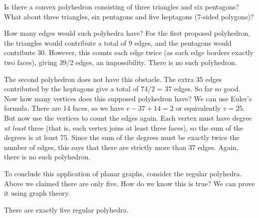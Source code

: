 \documentclass[12pt]{article}
\begin{document}
\begin{example}
Is there a convex polyhedron consisting of three triangles and six pentagons?  What about three triangles, six pentagons and five heptagons (7-sided polygons)?

\begin{solution}
How many edges would such polyhedra have?  For the first proposed polyhedron, the triangles would contribute a total of 9 edges, and the pentagons would contribute 30.  However, this counts each edge twice (as each edge borders exactly two faces), giving 39/2 edges, an impossibility.  There is no such polyhedron.

The second polyhedron does not have this obstacle. The extra 35 edges contributed by the heptagons give a total of 74/2 = 37 edges.  So far so good.  Now how many vertices does this supposed polyhedron have?  We can use Euler's formula.  There are 14 faces, so we have $v - 37 + 14 = 2$ or equivalently $v = 25$.  But now use the vertices to count the edges again.  Each vertex must have degree \emph{at least} three (that is, each vertex joins at least three faces), so the sum of the degrees is at least 75.  Since the sum of the degrees must be exactly twice the number of edges, this says that there are strictly more than 37 edges.  Again, there is no such polyhedron.
\end{solution}
\end{example}


To conclude this application of planar graphs, consider the regular polyhedra.  Above we claimed there are only five.  How do we know this is true?  We can prove it using graph theory.

\begin{theorem}
There are exactly five regular polyhedra.
\end{theorem}
\end{document}
